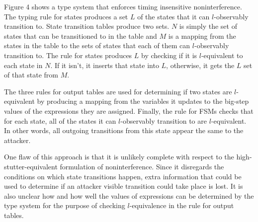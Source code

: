 \documentclass[paper=a4, fontsize=10pt]{scrartcl} %
\begin{document}
Figure 4 shows a type system that enforces timing insensitive noninterference.
The typing rule for states produces a set $L$ of the states that it can
$l$-observably transition to. State transition tables produce two sets. $N$ is
simply the set of states that can be transitioned to in the table and $M$ is a
mapping from the states in the table to the sets of states that each of them
can $l$-observably transition to. The rule for states produces $L$ by checking
if it is $l$-equivalent to each state in $N$. If it isn't, it inserts that state
into $L$, otherwise, it gets the $L$ set of that state from $M$.

The three rules for output tables are used for determining if two states are 
$l$-equivalent by producing a mapping from the variables it updates to the 
big-step values of the expressions they are assigned. Finally, the rule for 
FSMs checks that for each state, all of the states it can $l$-observably 
transition to are $l$-equivalent. In other words, all outgoing transitions from 
this state appear the same to the attacker.

One flaw of this approach is that it is unlikely complete with respect to the 
high-stutter-equivalent formulation of noninterference. Since it disregards the 
conditions on which state transitions happen, extra information that could be 
used to determine if an attacker visible transition could take place is lost. 
It is also unclear how and how well the values of expressions can be determined 
by the type system for the purpose of checking $l$-equivalence in the rule for 
output tables.
\end{document}
